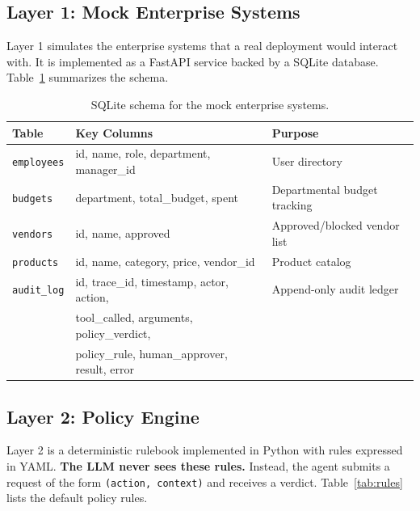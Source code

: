 \documentclass[11pt,a4paper]{article}
\begin{document}
\subsection{Layer 1: Mock Enterprise Systems}

Layer 1 simulates the enterprise systems that a real deployment would interact with. It is implemented as a FastAPI service backed by a SQLite database. Table~\ref{tab:schema} summarizes the schema.

\begin{table}[H]
\centering
\small
\caption{SQLite schema for the mock enterprise systems.}
\label{tab:schema}
\begin{tabular}{@{}lll@{}}
\toprule
\textbf{Table} & \textbf{Key Columns} & \textbf{Purpose} \\
\midrule
\texttt{employees} & id, name, role, department, manager\_id & User directory \\
\texttt{budgets} & department, total\_budget, spent & Departmental budget tracking \\
\texttt{vendors} & id, name, approved & Approved/blocked vendor list \\
\texttt{products} & id, name, category, price, vendor\_id & Product catalog \\
\texttt{audit\_log} & id, trace\_id, timestamp, actor, action, & Append-only audit ledger \\
                   & tool\_called, arguments, policy\_verdict, & \\
                   & policy\_rule, human\_approver, result, error & \\
\bottomrule
\end{tabular}
\end{table}

\subsection{Layer 2: Policy Engine}

Layer 2 is a deterministic rulebook implemented in Python with rules expressed in YAML. \textbf{The LLM never sees these rules.} Instead, the agent submits a request of the form \texttt{(action, context)} and receives a verdict. Table~\ref{tab:rules} lists the default policy rules.
\end{document}
